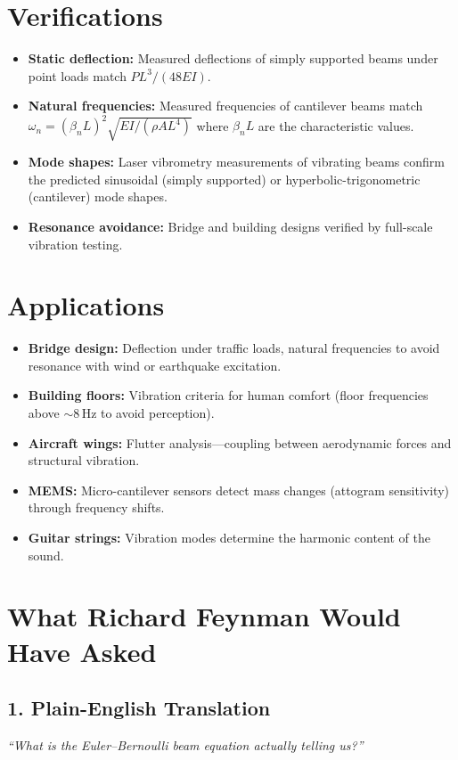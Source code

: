 \documentclass[11pt,openright]{book}
\begin{document}
\section*{Verifications}

\begin{itemize}
\item \textbf{Static deflection:} Measured deflections of simply supported beams under point loads match $PL^3/(48EI)$.
\item \textbf{Natural frequencies:} Measured frequencies of cantilever beams match $\omega_n = (\beta_n L)^2 \sqrt{EI/(\rho A L^4)}$ where $\beta_n L$ are the characteristic values.
\item \textbf{Mode shapes:} Laser vibrometry measurements of vibrating beams confirm the predicted sinusoidal (simply supported) or hyperbolic-trigonometric (cantilever) mode shapes.
\item \textbf{Resonance avoidance:} Bridge and building designs verified by full-scale vibration testing.
\end{itemize}
\section*{Applications}

\begin{itemize}
\item \textbf{Bridge design:} Deflection under traffic loads, natural frequencies to avoid resonance with wind or earthquake excitation.
\item \textbf{Building floors:} Vibration criteria for human comfort (floor frequencies above $\sim$8\,Hz to avoid perception).
\item \textbf{Aircraft wings:} Flutter analysis---coupling between aerodynamic forces and structural vibration.
\item \textbf{MEMS:} Micro-cantilever sensors detect mass changes (attogram sensitivity) through frequency shifts.
\item \textbf{Guitar strings:} Vibration modes determine the harmonic content of the sound.
\end{itemize}
\section*{What Richard Feynman Would Have Asked}

\subsection*{1. Plain-English Translation}
\textit{``What is the Euler--Bernoulli beam equation actually telling us?''}
\end{document}
